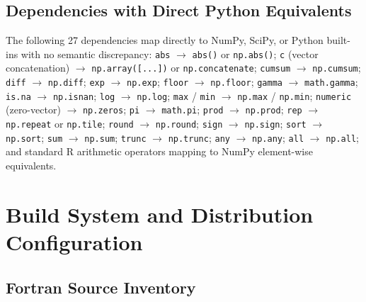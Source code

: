 \documentclass[12pt,a4paper]{article}
\begin{document}
\subsection{Dependencies with Direct Python Equivalents}

The following 27 dependencies map directly to NumPy, SciPy, or Python built-ins with no semantic discrepancy: \texttt{abs} $\to$ \texttt{abs()} or \texttt{np.abs()}; \texttt{c} (vector concatenation) $\to$ \texttt{np.array([...])} or \texttt{np.concatenate}; \texttt{cumsum} $\to$ \texttt{np.cumsum}; \texttt{diff} $\to$ \texttt{np.diff}; \texttt{exp} $\to$ \texttt{np.exp}; \texttt{floor} $\to$ \texttt{np.floor}; \texttt{gamma} $\to$ \texttt{math.gamma}; \texttt{is.na} $\to$ \texttt{np.isnan}; \texttt{log} $\to$ \texttt{np.log}; \texttt{max} / \texttt{min} $\to$ \texttt{np.max} / \texttt{np.min}; \texttt{numeric} (zero-vector) $\to$ \texttt{np.zeros}; \texttt{pi} $\to$ \texttt{math.pi}; \texttt{prod} $\to$ \texttt{np.prod}; \texttt{rep} $\to$ \texttt{np.repeat} or \texttt{np.tile}; \texttt{round} $\to$ \texttt{np.round}; \texttt{sign} $\to$ \texttt{np.sign}; \texttt{sort} $\to$ \texttt{np.sort}; \texttt{sum} $\to$ \texttt{np.sum}; \texttt{trunc} $\to$ \texttt{np.trunc}; \texttt{any} $\to$ \texttt{np.any}; \texttt{all} $\to$ \texttt{np.all}; and standard R arithmetic operators mapping to NumPy element-wise equivalents.

\section{Build System and Distribution Configuration}
\label{supp:build}

\subsection{Fortran Source Inventory}
\end{document}
